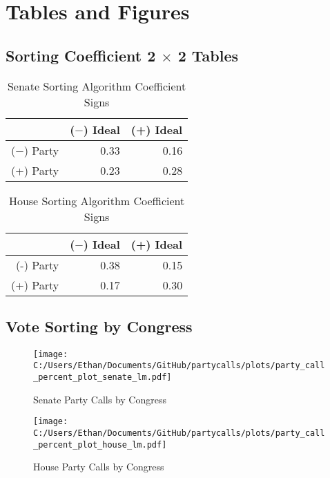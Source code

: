 \documentclass[12pt]{article}
\begin{document}
\section{Tables and Figures}
	
\subsection{Sorting Coefficient 2 $ \times $ 2 Tables}

\begin{table}[ht]
	\centering
	\caption{Senate Sorting Algorithm Coefficient Signs}
	\begin{tabular}{rrr}
		\hline
		& ($-$) Ideal & (+) Ideal \\ 
		\hline
		($-$) Party & 0.33 & 0.16 \\ 
		(+) Party & 0.23 & 0.28 \\ 
		\hline
	\end{tabular}
\end{table}

\begin{table}[ht]
	\centering
	\caption{House Sorting Algorithm Coefficient Signs}
	\begin{tabular}{rrr}
		\hline
		& ($-$) Ideal & (+) Ideal \\ 
		\hline
		(-) Party & 0.38 & 0.15 \\ 
		(+) Party & 0.17 & 0.30 \\ 
		\hline
	\end{tabular}
\end{table}

\clearpage

\subsection{Vote Sorting by Congress}

\begin{figure}[h]
	\centering
	\caption{Senate Party Calls by Congress}
	\texttt{[image: C:/Users/Ethan/Documents/GitHub/partycalls/plots/party\_call\_percent\_plot\_senate\_lm.pdf]}
\end{figure}


\begin{figure}[h]
	\centering
	\caption{House Party Calls by Congress}
	\texttt{[image: C:/Users/Ethan/Documents/GitHub/partycalls/plots/party\_call\_percent\_plot\_house\_lm.pdf]}
\end{figure}
\end{document}

